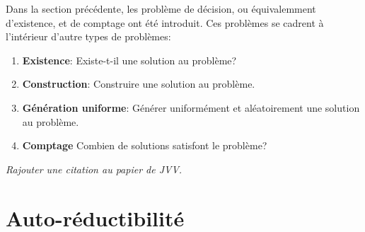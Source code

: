 Dans la section précédente, les problème de décision, ou équivalemment d'existence, et de comptage ont été introduit. Ces problèmes se cadrent à l'intérieur d'autre types de problèmes: 

\begin{enumerate}[(1)]
    \item \textbf{Existence}: Existe-t-il une solution au problème?
    \item \textbf{Construction}: Construire une solution au problème.
    \item \textbf{Génération uniforme}: Générer uniformément et aléatoirement une solution au problème.
    \item \textbf{Comptage} Combien de solutions satisfont le problème?
\end{enumerate}




\textcolor{mydarkred}{\textit{Rajouter une citation au papier de JVV.}}


\section{Auto-réductibilité}
\label{sec:auto-reductibilite}
 

